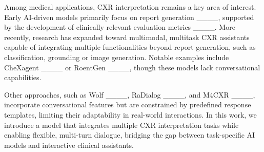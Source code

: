 Among medical applications, CXR interpretation remains a key area of interest. Early AI-driven models primarily focus on report generation ____, supported by the development of clinically relevant evaluation metrics ____. More recently, research has expanded toward multimodal, multitask CXR assistants capable of integrating multiple functionalities beyond report generation, such as classification, grounding or image generation. Notable examples include CheXagent ____ or RoentGen ____, though these models lack conversational capabilities. 

Other approaches, such as Wolf ____, RaDialog  ____, and M4CXR ____, incorporate conversational features but are constrained by predefined response templates, limiting their adaptability in real-world interactions. In this work, we introduce a model that integrates multiple CXR interpretation tasks while enabling flexible,  multi-turn dialogue, bridging the gap between task-specific AI models and interactive clinical assistants.